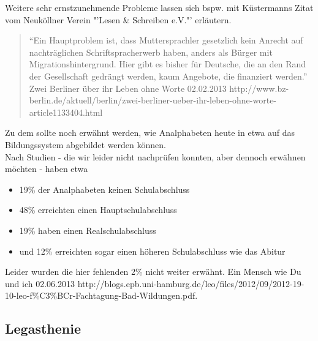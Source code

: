Weitere sehr ernstzunehmende Probleme lassen sich bspw. mit Küstermanns Zitat vom Neuköllner Verein "'Lesen \& Schreiben e.V."' erläutern.


\begin{quote}
	"`Ein Hauptproblem ist, dass Muttersprachler gesetzlich
	kein Anrecht auf nachträglichen Schriftspracherwerb
	haben, anders als Bürger mit Migrationshintergrund. Hier
	gibt es bisher für Deutsche, die an den Rand der
	Gesellschaft gedrängt werden, kaum Angebote, die
	finanziert werden."'
				{Zwei Berliner über ihr Leben ohne Worte}
				{02.02.2013}
				{http://www.bz-berlin.de/aktuell/berlin/zwei-berliner-ueber-ihr-leben-ohne-worte-article1133404.html}
\end{quote}


Zu dem sollte noch erwähnt werden, wie Analphabeten heute in etwa auf das Bildungssystem abgebildet werden können.\\
Nach Studien - die wir leider nicht nachprüfen konnten, aber dennoch erwähnen möchten - haben etwa 

\begin{itemize}
	\item 19\% der Analphabeten keinen Schulabschluss
	\item 48\% erreichten einen Hauptschulabschluss
	\item 19\% haben einen Realschulabschluss
	\item und 12\% erreichten sogar einen höheren Schulabschluss wie das Abitur
\end{itemize}

Leider wurden die hier fehlenden 2\% nicht weiter erwähnt.
				{Ein Mensch wie Du und ich}
				{02.06.2013}
				{http://blogs.epb.uni-hamburg.de/leo/files/2012/09/2012-19-10-leo-f\%C3\%BCr-Fachtagung-Bad-Wildungen.pdf.}



\subsection{Legasthenie}

